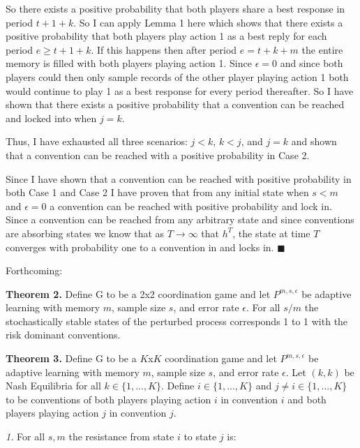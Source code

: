 \documentclass{article}
\begin{document}
\vskip6pt

So there exists a positive probability that both players share a best response in period $t+1+k$. So I can apply Lemma 1 here which shows that there exists a positive probability that both players play action 1 as a best reply for each period $e \geq t+1+k$. If this happens then after period $e=t+k+m$ the entire memory is filled with both players playing action 1. Since $\epsilon=0$ and since both players could then only sample records of the other player playing action 1 both would continue to play 1 as a best response for every period thereafter. So I have shown that there exists a positive probability that a convention can be reached and locked into when $j=k$. 

\vskip12pt

Thus, I have exhausted all three scenarios: $j<k$, $k<j$, and $j=k$ and shown that a convention can be reached with a positive probability in Case 2.

\vskip18pt

Since I have shown that a convention can be reached with positive probability in both Case 1 and Case 2 I have proven that from any initial state when $s<m$ and $\epsilon=0$ a convention can be reached with positive probability and lock in. Since a convention can be reached from any arbitrary state and since conventions are absorbing states we know that as $T \rightarrow \infty$ that $h^T$, the state at time $T$ converges with probability one to a convention in and locks in. $\blacksquare$

\pagebreak

Forthcoming:

\textbf{Theorem 2.} Define G to be a 2x2 coordination game and let $P^{m,s,\epsilon}$ be adaptive learning with memory $m$, sample size $s$, and error rate $\epsilon$. For all $s/m$ the stochastically stable states of the perturbed process corresponds 1 to 1 with the risk dominant conventions.

\vskip12pt

\textbf{Theorem 3.} Define G to be a $K$x$K$ coordination game and let $P^{m,s,\epsilon}$ be adaptive learning with memory $m$, sample size $s$, and error rate $\epsilon$. Let $(k,k)$ be Nash Equilibria for all $k \in \{1,...,K\}$. Define $i \in \{1,...,K\}$ and $j \neq i \in \{1,...,K\}$ to be conventions of both players playing action $i$ in convention $i$ and both players playing action $j$ in convention $j$.

\textit{1.} For all $s, m$ the resistance from state $i$ to state $j$ is:
\end{document}
